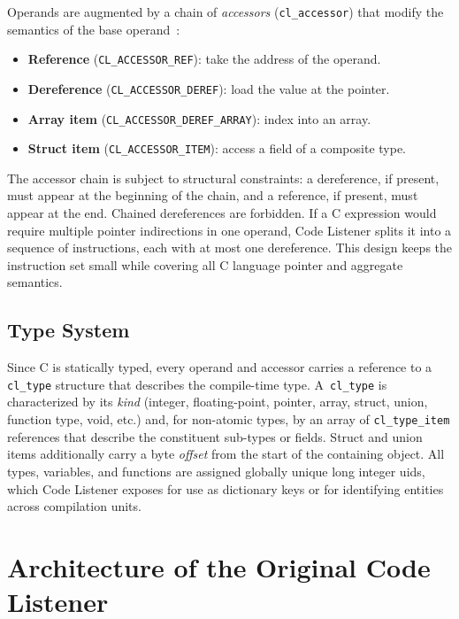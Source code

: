 Operands are augmented by a chain of \emph{accessors} (\texttt{cl\_accessor}) that modify the semantics of the base operand~\cite{CodeListener2012}:

\begin{itemize}
  \item \textbf{Reference} (\texttt{CL\_ACCESSOR\_REF}): take the address of the operand.
  \item \textbf{Dereference} (\texttt{CL\_ACCESSOR\_DEREF}): load the value at the pointer.
  \item \textbf{Array item} (\texttt{CL\_ACCESSOR\_DEREF\_ARRAY}): index into an array.
  \item \textbf{Struct item} (\texttt{CL\_ACCESSOR\_ITEM}): access a field of a composite type.
\end{itemize}

The accessor chain is subject to structural constraints: a dereference, if present, must appear at the beginning of the chain, and a reference, if present, must appear at the end. Chained dereferences are forbidden. If a C expression would require multiple pointer indirections in one operand, Code Listener splits it into a sequence of instructions, each with at most one dereference. This design keeps the instruction set small while covering all C language pointer and aggregate semantics.

\subsection{Type System}

Since C is statically typed, every operand and accessor carries a reference to a \texttt{cl\_type} structure that describes the compile-time type. A~\texttt{cl\_type} is characterized by its \emph{kind} (integer, floating-point, pointer, array, struct, union, function type, void, etc.) and, for non-atomic types, by an array of \texttt{cl\_type\_item} references that describe the constituent sub-types or fields. Struct and union items additionally carry a byte \emph{offset} from the start of the containing object. All types, variables, and functions are assigned globally unique long integer uids, which Code Listener exposes for use as dictionary keys or for identifying entities across compilation units.

\section{Architecture of the Original Code Listener}
\label{sec:cl-architecture}


